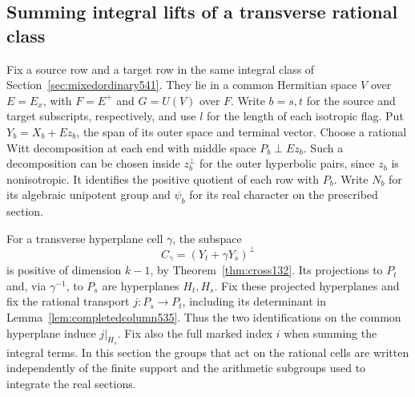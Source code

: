 \documentclass[a4paper,11pt]{article}
\theoremstyle{definition}
\theoremstyle{remark}
\numberwithin{equation}{section}
\begin{document}
\subsection{Summing integral lifts of a transverse rational class}
\label{sec:signedslice604}

Fix a source row and a target row in the same integral class
of Section~\ref{sec:mixedordinary541}. They lie in a common
Hermitian space \(V\) over \(E=E_x\), with \(F=E^+\) and
\(G=U(V)\) over \(F\). Write \(b=s,t\) for the source and
target subscripts, respectively, and use \(l\) for the length
of each isotropic flag. Put \(Y_b=X_b+E z_b\), the span of
its outer space and terminal vector. Choose a rational Witt
decomposition at each end with middle space \(P_b\perp E z_b\).
Such a decomposition can be chosen inside \(z_b^\perp\) for the
outer hyperbolic pairs, since \(z_b\) is nonisotropic. It
identifies the positive quotient of each row with \(P_b\).
Write \(N_b\) for its algebraic unipotent group and
\(\psi_b\) for its real character on the prescribed section.

For a transverse hyperplane cell \(\gamma\), the subspace
\[
                    C_\gamma=(Y_t+\gamma Y_s)^\perp
\]
is positive of dimension \(k-1\), by Theorem~\ref{thm:cross132}.
Its projections to \(P_t\) and, via \(\gamma^{-1}\), to \(P_s\)
are hyperplanes \(H_t,H_s\). Fix these projected hyperplanes
and fix the rational transport \(j:P_s\to P_t\), including
its determinant in Lemma~\ref{lem:completedcolumn535}.
Thus the two identifications on the common hyperplane induce
\(j|_{H_s}\). Fix also the full marked index \(i\) when
summing the integral terms. In this section the groups that
act on the rational cells are written independently of the
finite support and the arithmetic subgroups used to integrate
the real sections.
\end{document}
